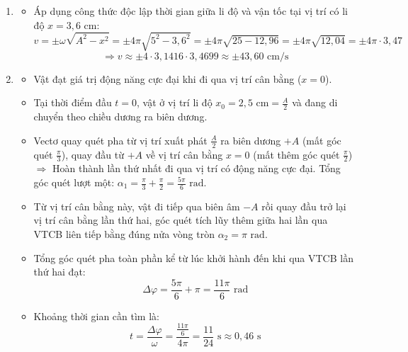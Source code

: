 \begin{ex}
{\begin{enumerate}
\begin{itemize}
			\end{itemize}
			\item[c)] 
			\begin{itemize}
				\item Áp dụng công thức độc lập thời gian giữa li độ và vận tốc tại vị trí có li độ $x = 3,6\text{ cm}$:
				$$v = \pm \omega\sqrt{A^2 - x^2} = \pm 4\pi\sqrt{5^2 - 3,6^2} = \pm 4\pi\sqrt{25 - 12,96} = \pm 4\pi\sqrt{12,04} = \pm 4\pi \cdot 3,47$$
				$$\Rightarrow v \approx \pm 4 \cdot 3,1416 \cdot 3,4699 \approx \pm 43,60\text{ cm/s} \text{}$$
			\end{itemize}
			\item[d)] 
			\begin{itemize}
				\item Vật đạt giá trị động năng cực đại khi đi qua vị trí cân bằng ($x = 0$).
				\item Tại thời điểm đầu $t=0$, vật ở vị trí li độ $x_0 = 2,5\text{ cm} = \frac{A}{2}$ và đang di chuyển theo chiều dương ra biên dương.
				\item Vectơ quay quét pha từ vị trí xuất phát $\frac{A}{2}$ ra biên dương $+A$ (mất góc quét $\frac{\pi}{3}$), quay đầu từ $+A$ về vị trí cân bằng $x=0$ (mất thêm góc quét $\frac{\pi}{2}$) $\Rightarrow$ Hoàn thành lần thứ nhất đi qua vị trí có động năng cực đại. Tổng góc quét lượt một: $\alpha_1 = \frac{\pi}{3} + \frac{\pi}{2} = \frac{5\pi}{6}\text{ rad}$.
				\item Từ vị trí cân bằng này, vật đi tiếp qua biên âm $-A$ rồi quay đầu trở lại vị trí cân bằng lần thứ hai, góc quét tích lũy thêm giữa hai lần qua VTCB liên tiếp bằng đúng nửa vòng tròn $\alpha_2 = \pi\text{ rad}$.
				\item Tổng góc quét pha toàn phần kể từ lúc khởi hành đến khi qua VTCB lần thứ hai đạt:
				$$\Delta \varphi = \frac{5\pi}{6} + \pi = \frac{11\pi}{6}\text{ rad} \text{}$$
				\item Khoảng thời gian cần tìm là:
				$$t = \frac{\Delta \varphi}{\omega} = \frac{\frac{11\pi}{6}}{4\pi} = \frac{11}{24}\text{ s} \approx 0,46\text{ s} \text{}$$
			\end{itemize}
		\end{enumerate}
	}
\end{ex}

